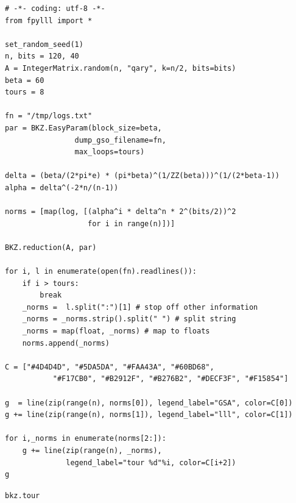 \documentclass[10pt,a4paper,nobib]{tufte-handout}
\begin{document}
\lstset{language=Python,label= ,caption= ,captionpos=b,numbers=none}
\begin{lstlisting}
# -*- coding: utf-8 -*-
from fpylll import *

set_random_seed(1)
n, bits = 120, 40
A = IntegerMatrix.random(n, "qary", k=n/2, bits=bits)
beta = 60
tours = 8

fn = "/tmp/logs.txt"
par = BKZ.EasyParam(block_size=beta,
                dump_gso_filename=fn,
                max_loops=tours)

delta = (beta/(2*pi*e) * (pi*beta)^(1/ZZ(beta)))^(1/(2*beta-1))
alpha = delta^(-2*n/(n-1))

norms = [map(log, [(alpha^i * delta^n * 2^(bits/2))^2
                   for i in range(n)])]

BKZ.reduction(A, par)

for i, l in enumerate(open(fn).readlines()):
    if i > tours:
        break
    _norms =  l.split(":")[1] # stop off other information
    _norms = _norms.strip().split(" ") # split string
    _norms = map(float, _norms) # map to floats
    norms.append(_norms)
        
C = ["#4D4D4D", "#5DA5DA", "#FAA43A", "#60BD68", 
           "#F17CB0", "#B2912F", "#B276B2", "#DECF3F", "#F15854"]

g  = line(zip(range(n), norms[0]), legend_label="GSA", color=C[0])
g += line(zip(range(n), norms[1]), legend_label="lll", color=C[1])

for i,_norms in enumerate(norms[2:]):
    g += line(zip(range(n), _norms), 
              legend_label="tour %d"%i, color=C[i+2])
g
\end{lstlisting}

\texttt{bkz.tour}
\end{document}
